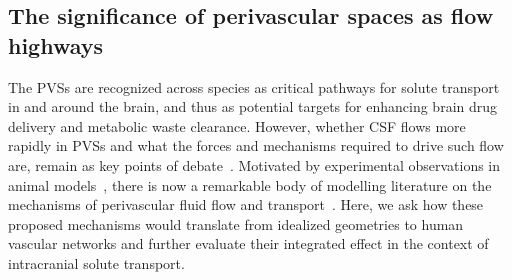 \documentclass[fleqn,10pt]{wlscirep}
\newcommand{\mer}[1]{\textcolor{magenta}{#1}}
\newcommand{\mar}[1]{\textcolor{violet}{#1}}
\begin{document}


\subsection*{The significance of perivascular spaces as flow highways}
\label{sec:pvs_flow_results}

The PVSs are recognized across species as critical pathways for solute
transport in and around the brain\cite{}, and thus as potential
targets for enhancing brain drug delivery and metabolic waste
clearance\cite{}. However, whether CSF flows more rapidly in PVSs and
what the forces and mechanisms required to drive such flow are, remain
as key points of debate~\cite{bohr2022glymphatic,
  van2024caa}. Motivated by experimental observations in animal
models~\cite{iliff2012paravascular, iliff2013cerebral,mestre2018flow,
  bedussi2018flow}, there is now a remarkable body of modelling
literature on the mechanisms of perivascular fluid flow and
transport~\cite{bilston2003arterial, asgari2016glymphatic,
  rey2018pulsatile, daversin2020mechanisms, sharp2019dispersion,
  kedarasetti2020functional, kedarasetti2020arterial,
  troyetsky2021dispersion, martinac2021phase, gjerde2023directional,
  nozaleda2024arterial}. Here, we ask how these proposed mechanisms
would translate from idealized geometries to human vascular networks
and further evaluate their integrated effect in the context of
intracranial solute transport.
\end{document}

